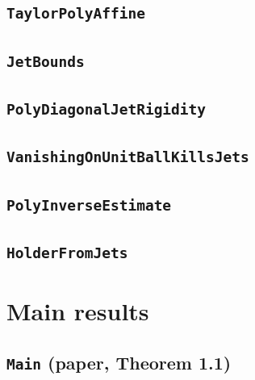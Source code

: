 \documentclass[11pt]{amsart}
\theoremstyle{definition}
\begin{document}
\subsection{\texorpdfstring{\texttt{TaylorPolyAffine}}{TaylorPolyAffine}}\label{node:TaylorPolyAffine}


\subsection{\texorpdfstring{\texttt{JetBounds}}{JetBounds}}\label{node:JetBounds}


\subsection{\texorpdfstring{\texttt{PolyDiagonalJetRigidity}}{PolyDiagonalJetRigidity}}\label{node:PolyDiagonalJetRigidity}


\subsection{\texorpdfstring{\texttt{VanishingOnUnitBallKillsJets}}{VanishingOnUnitBallKillsJets}}\label{node:VanishingOnUnitBallKillsJets}


\subsection{\texorpdfstring{\texttt{PolyInverseEstimate}}{PolyInverseEstimate}}\label{node:PolyInverseEstimate}


\subsection{\texorpdfstring{\texttt{HolderFromJets}}{HolderFromJets}}\label{node:HolderFromJets}


\section{Main results}\label{sec:main}
\subsection{\texorpdfstring{\texttt{Main} (paper, Theorem 1.1)}{Main}}\label{node:Main}

\end{document}
